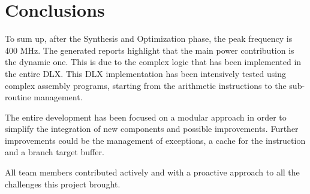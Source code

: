 \chapter{Conclusions}
To sum up, after the Synthesis and Optimization phase, the peak frequency is 400 MHz. The generated reports highlight that the main power contribution is the dynamic one. This is due to the complex logic that has been implemented in the entire DLX. This DLX implementation has been intensively tested using complex assembly programs, starting from the arithmetic instructions to the sub-routine management.

The entire development has been focused on a modular approach in order to simplify the integration of new components and possible improvements. Further improvements could be the management of exceptions, a cache for the instruction and a branch target buffer.

All team members contributed actively and with a proactive approach to all the challenges this project brought. 
